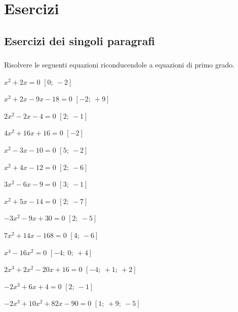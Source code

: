 
\section{Esercizi}

\subsection{Esercizi dei singoli paragrafi}

\subsubsection*{}

\begin{esercizio}[\Ast]
\label{ese:20.1}
Risolvere le seguenti equazioni riconducendole a equazioni di primo grado.
\begin{multicols}{2}
\begin{enumeratea}
 \item $x^{2}+2x=0$ \hfill $\left[0;~-2\right]$
 \item $x^{2}+2x-9x-18=0$ \hfill $\left[-2;~+9\right]$
 \item $2x^{2}-2x-4=0$ \hfill $\left[2;~-1\right]$
 \item $4x^{2}+16x+16=0$ \hfill $\left[-2\right]$
 \item $x^{2}-3x-10=0$ \hfill $\left[5;~-2\right]$
 \item $x^{2}+4x-12=0$ \hfill $\left[2;~-6\right]$
 \item $3x^{2}-6x-9=0$ \hfill $\left[3;~-1\right]$
 \item $x^{2}+5x-14=0$ \hfill $\left[2;~-7\right]$
 \item $-3x^{2}-9x+30=0$ \hfill $\left[2;~-5\right]$
 \item $7x^{2}+14x-168=0$ \hfill $\left[4;~-6\right]$
 \item $x^{4}-16x^{2}=0$ \hfill $\left[-4;~0;~+4\right]$
 \item $2x^{3}+2x^{2}-20x+16=0$ \hfill $\left[-4;~+1;~+2\right]$
 \item $-2x^{3}+6x+4=0$ \hfill $\left[2;~-1\right]$
 \item $-2x^{3}+10x^{2}+82x-90=0$ \hfill $\left[1;~+9;~-5\right]$
\end{enumeratea}
\end{multicols}
\end{esercizio}


